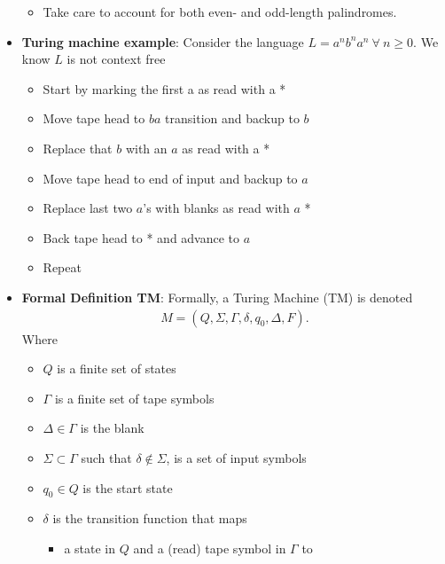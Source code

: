 \documentclass{report}
\begin{document}
\begin{itemize}
\begin{itemize}
                \item Take care to account for both even- and odd-length palindromes.
            \end{itemize}
            \bigbreak \noindent 
        \item \textbf{Turing machine example}: Consider the language $L = a^{n}b^{n}a^{n} \ \forall \ n \geq 0$. We know $L$ is not context free
            \begin{itemize}
                \item Start by marking the first a as read with a *
                \item Move tape head to $ba$ transition and backup to $b$
                \item Replace that $b$ with an $a$ as read with a *
                \item  Move tape head to end of input and backup to $a$
                \item Replace last two $a$’s with blanks as read with $a$ * 
                \item Back tape head to * and advance to $a$
                \item Repeat
            \end{itemize}
            \bigbreak \noindent 
        \item \textbf{Formal Definition TM}: Formally, a Turing Machine (TM) is denoted
            \begin{align*}
                M = (Q, \Sigma, \Gamma, \delta, q_{0}, \Delta, F)
            .\end{align*}
            Where
            \begin{itemize}
                \item $Q$ is a finite set of states
                \item $\Gamma$ is a finite set of tape symbols
                \item $\Delta \in \Gamma$ is the blank
                \item $\Sigma \subset \Gamma$ such that $\delta \not\in \Sigma$, is a set of input symbols
                \item $q_{0} \in Q$ is the start state
                \item $\delta$ is the transition function that maps 
                    \begin{itemize}
                        \item a state in $Q$ and a (read) tape symbol in $\Gamma$ to

\end{itemize}
\end{itemize}
\end{itemize}
\end{document}
